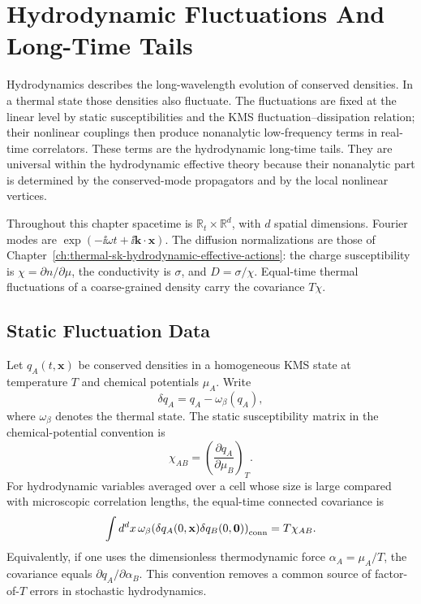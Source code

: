 \chapter{Hydrodynamic Fluctuations And Long-Time Tails}
\label{ch:thermal-hydrodynamic-fluctuations}

\ConventionsRealTime

Hydrodynamics describes the long-wavelength evolution of conserved
densities.  In a thermal state those densities also fluctuate.  The
fluctuations are fixed at the linear level by static susceptibilities and
the KMS fluctuation--dissipation relation; their nonlinear couplings then
produce nonanalytic low-frequency terms in real-time correlators.  These
terms are the hydrodynamic long-time tails.  They are universal within the
hydrodynamic effective theory because their nonanalytic part is determined by
the conserved-mode propagators and by the local nonlinear vertices.

Throughout this chapter spacetime is \(\mathbb R_t\times\mathbb R^d\), with
\(d\) spatial dimensions.  Fourier modes are
\(\exp(-\ii\omega t+\ii\mathbf k\cdot\mathbf x)\).  The diffusion
normalizations are those of
Chapter~\ref{ch:thermal-sk-hydrodynamic-effective-actions}: the charge
susceptibility is \(\chi=\partial n/\partial\mu\), the conductivity is
\(\sigma\), and \(D=\sigma/\chi\).  Equal-time thermal fluctuations of a
coarse-grained density carry the covariance \(T\chi\).

\section{Static Fluctuation Data}

Let \(q_A(t,\mathbf x)\) be conserved densities in a homogeneous KMS state
at temperature \(T\) and chemical potentials \(\mu_A\).  Write
\[
  \delta q_A=q_A-\omega_\beta(q_A),
\]
where \(\omega_\beta\) denotes the thermal state.  The static susceptibility
matrix in the chemical-potential convention is
\[
  \chi_{AB}
  =
  \left(\frac{\partial q_A}{\partial\mu_B}\right)_T .
\]
For hydrodynamic variables averaged over a cell whose size is large compared
with microscopic correlation lengths, the equal-time connected covariance is
\begin{equation}
  \int d^dx\,
  \omega_\beta\!\left(
    \delta q_A(0,\mathbf x)\delta q_B(0,\mathbf0)
  \right)_{\rm conn}
  =
  T\chi_{AB}.
  \label{eq:hydro-fluct-static-covariance}
\end{equation}
Equivalently, if one uses the dimensionless thermodynamic force
\(\alpha_A=\mu_A/T\), the covariance equals
\(\partial q_A/\partial\alpha_B\).  This convention removes a common source
of factor-of-\(T\) errors in stochastic hydrodynamics.

